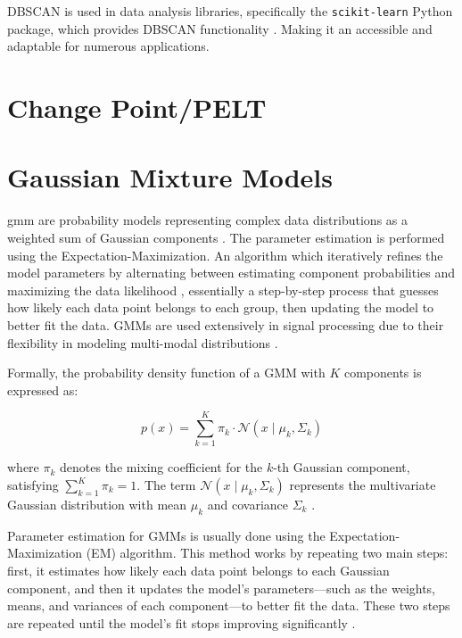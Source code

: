 \documentclass[class=report,11pt,crop=false]{standalone}
\begin{document}
DBSCAN is used in data analysis libraries, specifically the \texttt{scikit-learn} Python package, which provides DBSCAN functionality \cite{pedregosa2011scikit}. Making it an accessible and adaptable for numerous applications.

\section{Change Point/PELT}


\section{Gaussian Mixture Models}

\gls{gmm} are probability models representing complex data distributions as a weighted sum of Gaussian components \cite{bishop2006pattern}. The parameter estimation is performed using the Expectation-Maximization. An algorithm which iteratively refines the model parameters by alternating between estimating component probabilities and maximizing the data likelihood \cite{bishop2006pattern}, essentially a step-by-step process that guesses how likely each data point belongs to each group, then updating the model to better fit the data. GMMs are used extensively in signal processing due to their flexibility in modeling multi-modal distributions \cite{reynolds2015gaussian}.

Formally, the probability density function of a GMM with \(K\) components is expressed as:

\begin{equation}
\label{eq:gmm}
p(x) = \sum_{k=1}^{K} \pi_k \cdot \mathcal{N}(x \mid \mu_k, \Sigma_k)
\end{equation}


where \(\pi_k\) denotes the mixing coefficient for the \(k\)-th Gaussian component, satisfying \(\sum_{k=1}^{K} \pi_k = 1\). The term \(\mathcal{N}(x \mid \mu_k, \Sigma_k)\) represents the multivariate Gaussian distribution with mean \(\mu_k\) and covariance \(\Sigma_k\) \cite{bishop2006pattern}.

Parameter estimation for GMMs is usually done using the Expectation-Maximization (EM) algorithm. This method works by repeating two main steps: first, it estimates how likely each data point belongs to each Gaussian component, and then it updates the model’s parameters—such as the weights, means, and variances of each component—to better fit the data. These two steps are repeated until the model’s fit stops improving significantly \cite{bishop2006pattern}.
\end{document}
